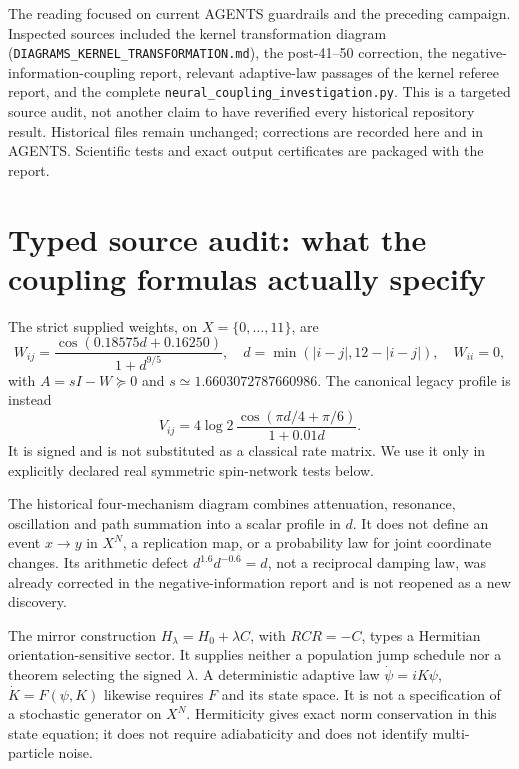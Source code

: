 \documentclass[11pt,a4paper]{article}
\begin{document}
The reading focused on current AGENTS guardrails and the preceding campaign.
Inspected sources included the kernel transformation diagram
(\nolinkurl{DIAGRAMS_KERNEL_TRANSFORMATION.md}), the post-41--50 correction,
the negative-information-coupling report, relevant adaptive-law passages
of the kernel referee report, and the complete
\nolinkurl{neural_coupling_investigation.py}. This is a targeted source audit,
not another claim to have reverified every historical repository result.
Historical files remain unchanged; corrections are recorded here and in
AGENTS. Scientific tests and exact output certificates are packaged with
the report.

\section{Typed source audit: what the coupling formulas actually specify}

The strict supplied weights, on $X=\{0,\ldots,11\}$, are
\[
 W_{ij}=\frac{\cos(0.18575d+0.16250)}{1+d^{9/5}},\quad
 d=\min(|i-j|,12-|i-j|),\quad W_{ii}=0,
\]
with $A=sI-W\succeq0$ and $s\simeq1.6603072787660986$.
The canonical legacy profile is instead
\[
 V_{ij}=4\log2\,\frac{\cos(\pi d/4+\pi/6)}{1+0.01d}.
\]
It is signed and is not substituted as a classical rate matrix. We use it
only in explicitly declared real symmetric spin-network tests below.

The historical four-mechanism diagram combines attenuation, resonance,
oscillation and path summation into a scalar profile in $d$. It does not
define an event $x\to y$ in $X^N$, a replication map, or a probability law
for joint coordinate changes. Its arithmetic defect
$d^{1.6}d^{-0.6}=d$, not a reciprocal damping law, was already corrected
in the negative-information report and is not reopened as a new discovery.

The mirror construction $H_\lambda=H_0+\lambda C$, with
$RCR=-C$, types a Hermitian orientation-sensitive sector. It supplies
neither a population jump schedule nor a theorem selecting the signed
$\lambda$. A deterministic adaptive law
$\dot\psi=iK\psi$, $\dot K=F(\psi,K)$ likewise requires $F$ and its state
space. It is not a specification of a stochastic generator on $X^N$.
Hermiticity gives exact norm conservation in this state equation; it does
not require adiabaticity and does not identify multi-particle noise.
\end{document}
